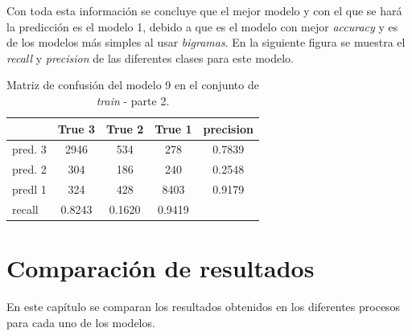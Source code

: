 \documentclass[es]{uc3mreport}
\begin{document}
\begin{report}
    Con toda esta información se concluye que el mejor modelo y con el que se
    hará la predicción es el modelo 1, debido a que es el modelo con mejor
    \textit{accuracy} y es de los modelos más simples al usar \textit{bigramas}.
    En la siguiente figura se muestra el \textit{recall} y \textit{precision} de
    las diferentes clases para este modelo.

\begin{table}[H]
\center
\begin{tabular}{@{}lccc|c@{}}
    \toprule
             & True 3 & True 2 & True 1 & precision\\
    \hline
    pred. 3  & 2946   & 534    & 278    & 0.7839   \\
    pred. 2  & 304    & 186    & 240    & 0.2548   \\
    predl 1  & 324    & 428    & 8403   & 0.9179   \\
    \hline
    recall   & 0.8243 & 0.1620 & 0.9419 &          \\
    \bottomrule
\end{tabular}
\caption{Matriz de confusión del modelo 9 en el conjunto de \textit{train} -
parte 2.}
\end{table}


\section{Comparación de resultados}
\label{chap:resultados}

En este capítulo se comparan los resultados obtenidos en los diferentes procesos para cada uno de los modelos.


\end{report}
\end{document}
